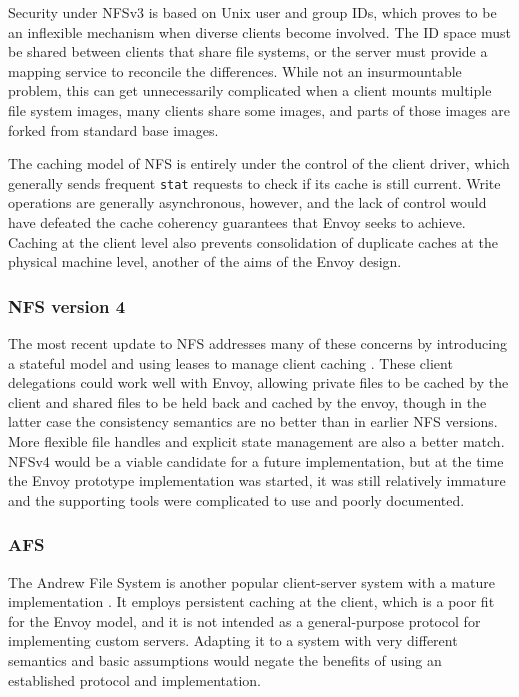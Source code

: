 Security under NFSv3 is based on Unix user and group IDs, which proves to be an inflexible mechanism when diverse clients become involved. The ID space must be shared between clients that share file systems, or the server must provide a mapping service to reconcile the differences. While not an insurmountable problem, this can get unnecessarily complicated when a client mounts multiple file system images, many clients share some images, and parts of those images are forked from standard base images.

The caching model of NFS is entirely under the control of the client driver, which generally sends frequent \texttt{stat} requests to check if its cache is still current. Write operations are generally asynchronous, however, and the lack of control would have defeated the cache coherency guarantees that Envoy seeks to achieve. Caching at the client level also prevents consolidation of duplicate caches at the physical machine level, another of the aims of the Envoy design.

\subsubsection{NFS version 4}

The most recent update to NFS addresses many of these concerns by introducing a stateful model and using leases to manage client caching \cite{shepler}. These client delegations could work well with Envoy, allowing private files to be cached by the client and shared files to be held back and cached by the envoy, though in the latter case the consistency semantics are no better than in earlier NFS versions. More flexible file handles and explicit state management are also a better match. NFSv4 would be a viable candidate for a future implementation, but at the time the Envoy prototype implementation was started, it was still relatively immature and the supporting tools were complicated to use and poorly documented.

\subsubsection{AFS}

The Andrew File System is another popular client-server system with a mature implementation \cite{satyanarayanan85,howard}. It employs persistent caching at the client, which is a poor fit for the Envoy model, and it is not intended as a general-purpose protocol for implementing custom servers. Adapting it to a system with very different semantics and basic assumptions would negate the benefits of using an established protocol and implementation.

